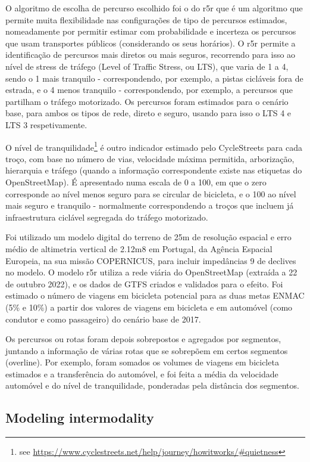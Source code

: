 \documentclass[runningheads]{llncs}
\begin{document}
O algoritmo de escolha de percurso escolhido foi o do r5r que é um
algoritmo que permite muita flexibilidade nas configurações de tipo de
percursos estimados, nomeadamente por permitir estimar com probabilidade
e incerteza os percursos que usam transportes públicos (considerando os
seus horários). O r5r permite a identificação de percursos mais diretos
ou mais seguros, recorrendo para isso ao nível de stress de tráfego
(Level of Traffic Stress, ou LTS), que varia de 1 a 4, sendo o 1 mais
tranquilo - correspondendo, por exemplo, a pistas cicláveis fora de
estrada, e o 4 menos tranquilo - correspondendo, por exemplo, a
percursos que partilham o tráfego motorizado. Os percursos foram
estimados para o cenário base, para ambos os tipos de rede, direto e
seguro, usando para isso o LTS 4 e LTS 3 respetivamente.

O nível de tranquilidade\footnote{see
  \url{https://www.cyclestreets.net/help/journey/howitworks/\#quietness}}
é outro indicador estimado pelo CycleStreets para cada troço, com base
no número de vias, velocidade máxima permitida, arborização, hierarquia
e tráfego (quando a informação correspondente existe nas etiquetas do
OpenStreetMap). É apresentado numa escala de 0 a 100, em que o zero
corresponde ao nível menos seguro para se circular de bicicleta, e o 100
ao nível mais seguro e tranquilo - normalmente correspondendo a troços
que incluem já infraestrutura ciclável segregada do tráfego motorizado.

Foi utilizado um modelo digital do terreno de 25m de resolução espacial
e erro médio de altimetria vertical de 2.12m8 em Portugal, da Agência
Espacial Europeia, na sua missão COPERNICUS, para incluir impedâncias 9
de declives no modelo. O modelo r5r utiliza a rede viária do
OpenStreetMap (extraída a 22 de outubro 2022), e os dados de GTFS
criados e validados para o efeito. Foi estimado o número de viagens em
bicicleta potencial para as duas metas ENMAC (5\% e 10\%) a partir dos
valores de viagens em bicicleta e em automóvel (como condutor e como
passageiro) do cenário base de 2017.

Os percursos ou rotas foram depois sobrepostos e agregados por
segmentos, juntando a informação de várias rotas que se sobrepõem em
certos segmentos (overline). Por exemplo, foram somados os volumes de
viagens em bicicleta estimados e a transferência do automóvel, e foi
feita a média da velocidade automóvel e do nível de tranquilidade,
ponderadas pela distância dos segmentos.

\hypertarget{modeling-intermodality}{%
\subsection{Modeling intermodality}\label{modeling-intermodality}}
\end{document}
